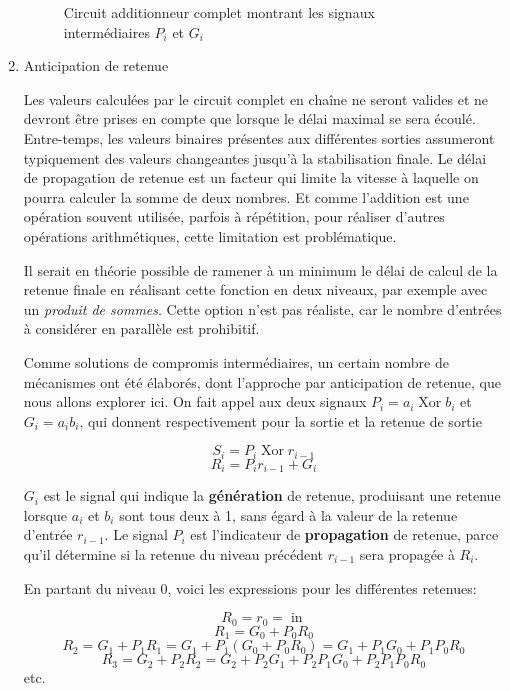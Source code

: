 \documentclass[letter, oneside]{book}
\begin{document}
\begin{enumerate}
\begin{figure}[htbp]
\centering

\caption{\label{fig:orgb348ed1}Circuit additionneur complet montrant les signaux intermédiaires \(P_i\) et \(G_i\)}
\end{figure}

\item Anticipation de retenue
\label{sec:org43b2bff}

Les valeurs calculées par le circuit complet en chaîne ne seront
valides et ne devront être prises en compte que lorsque le délai
maximal se sera écoulé. Entre-temps, les valeurs binaires présentes
aux différentes sorties assumeront typiquement des valeurs changeantes
jusqu'à la stabilisation finale. Le délai de propagation de retenue est
un facteur qui limite la vitesse à laquelle on pourra calculer la
somme de deux nombres. Et comme l'addition est une opération 
souvent utilisée, parfois à répétition, pour réaliser d'autres
opérations arithmétiques, cette limitation est problématique. 

Il serait en théorie possible de ramener à un minimum le délai de
calcul de la retenue finale en réalisant cette fonction en deux
niveaux, par exemple avec un \emph{produit de sommes}. Cette option n'est pas
réaliste, car le nombre d'entrées à considérer en parallèle est prohibitif.

Comme solutions de compromis intermédiaires, un certain nombre de
mécanismes ont été élaborés, dont l'approche par anticipation de
retenue, que nous allons explorer ici. On fait appel aux deux signaux
\(P_i = a_i \operatorname{Xor} b_i\) et \(G_i = a_i b_i\), qui donnent
respectivement pour la sortie et la retenue de sortie

$$S_i = P_i \operatorname{Xor} r_{i-1}$$
$$R_i = P_i r_{i-1} + G_i$$

\(G_i\) est le signal qui indique la \textbf{génération} de retenue,
produisant une retenue lorsque \(a_i\) et \(b_i\) sont tous deux à 1,
sans égard à la valeur de la retenue d'entrée \(r_{i-1}\). Le signal
\(P_i\) est l'indicateur de \textbf{propagation} de retenue, parce qu'il
détermine si la retenue du niveau précédent \(r_{i-1}\) sera propagée
à \(R_i\).

En partant du niveau 0, voici les expressions pour les différentes retenues:

$$R_0 = r_0 = \operatorname{in}$$
$$R_1 = G_0 + P_0 R_0$$
$$R_2 = G_1 + P_1 R_1 = G_1 + P_1 (G_0 + P_0 R_0) = G_1 + P_1 G_0 + P_1 P_0 R_0$$
$$R_3 = G_2 + P_2 R_2 = G_2 + P_2 G_1 + P_2 P_1 G_0 + P_2 P_1 P_0 R_0$$
etc.


\end{enumerate}
\end{document}
